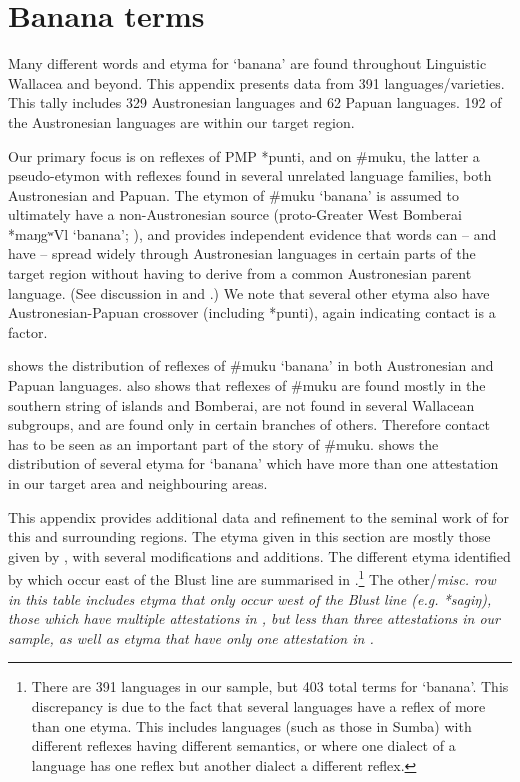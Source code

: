 \chapter{Banana terms}\label{ch:BanTer}
Many different words
and etyma for ‘banana’ are found throughout
Linguistic Wallacea and beyond.
This appendix presents data from 391 languages/varieties.
This tally includes 329 Austronesian languages
and 62 Papuan languages.
192 of the Austronesian languages are within our target region.

Our primary focus is on reflexes of PMP *punti,
and on {\#}muku, the latter a pseudo-etymon with reflexes found
in several unrelated language families,
both Austronesian and Papuan.
The etymon of {\#}muku ‘banana’ is assumed to ultimately have
a non-Austronesian source (proto-Greater West Bomberai *maŋgʷVl
‘banana’; \citealp[478, 486]{UsherSchapper2022}),
and provides independent evidence that words can -- and have -- spread
widely through Austronesian languages in certain parts of the
target region without having to derive from a common Austronesian parent language.
(See discussion in 
and .) We note that several
other etyma also have Austronesian-Papuan crossover (including
*punti), again indicating contact is a factor.

 shows the distribution of reflexes of {\#}muku ‘banana’
in both Austronesian and Papuan languages.
 also shows that reflexes of {\#}muku are found mostly
in the southern string of islands
and Bomberai, are not found in several Wallacean subgroups,
and are found only in certain branches of others.
Therefore contact has to be seen as an important part of the story of {\#}muku.
 shows the distribution of several etyma for ‘banana’
which have more than one attestation in our target area and neighbouring areas.

This appendix provides additional data
and refinement to the seminal work of \citet{DonohueDenham2009}
for this and surrounding regions.
The etyma given in this section are mostly those given by \citet{DonohueDenham2009},
with several modifications and additions.
The different etyma identified by \citeauthor{DonohueDenham2009}
which occur east of the Blust line are summarised
in .\footnote{
		There are 391 languages in our sample,
		but 403 total terms for ‘banana’.
		This discrepancy is due to the fact that several languages
		have a reflex of more than one etyma.
		This includes languages (such as those in Sumba)
		with different reflexes having different semantics,
		or where one dialect of a language has one reflex
		but another dialect a different reflex.}
The other/\it{misc.} row in this table includes
etyma that only occur west of the Blust line (e.g. *sagiŋ),
those which have multiple attestations in \citet{DonohueDenham2009},
but less than three attestations in our sample,
as well as etyma that have only one attestation in \citeauthor{DonohueDenham2009}.

